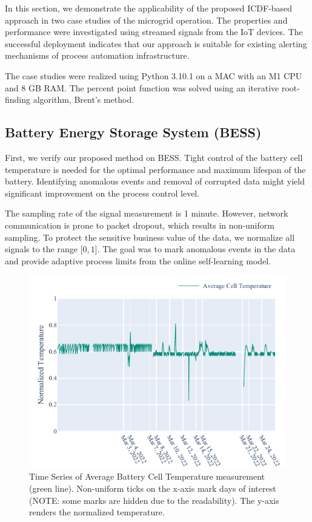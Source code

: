 In this section, we demonstrate the applicability of the proposed ICDF-based approach in two case studies of the microgrid operation. The properties and performance were investigated using streamed signals from the IoT devices. The successful deployment indicates that our approach is suitable for existing alerting mechanisms of process automation infrastructure.

The case studies were realized using Python 3.10.1 on a MAC with an M1 CPU and 8 GB RAM. The percent point function was solved using an iterative root-finding algorithm, Brent's method.

\subsection{Battery Energy Storage System (BESS)}\label{AA:Case1}
First, we verify our proposed method on BESS. Tight control of the battery cell temperature is needed for the optimal performance and maximum lifespan of the battery. Identifying anomalous events and removal of corrupted data might yield significant improvement on the process control level. 

The sampling rate of the signal measurement is 1 minute. However, network communication is prone to packet dropout, which results in non-uniform sampling. To protect the sensitive business value of the data, we normalize all signals to the range $[0, 1$]. The goal was to mark anomalous events in the data and provide adaptive process limits from the online self-learning model. 

\begin{figure}[htbp]
\centerline{\includegraphics{figures/Average_Cell_Temperature_168_hours_sliding_signal.pdf}}
\caption{Time Series of Average Battery Cell Temperature measurement (green line). Non-uniform ticks on the x-axis mark days of interest (NOTE: some marks are hidden due to the readability). The y-axis renders the normalized temperature.}
\label{fig:signal}
\end{figure}

